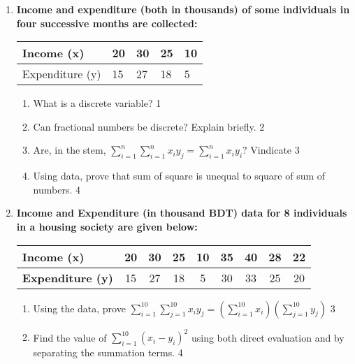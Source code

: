 \documentclass[a4paper,oneside]{book}
\begin{document}
\begin{enumerate}
  \item
  \textbf{Income and expenditure (both in thousands) of some individuals in four successive months are collected:}
 
\begin{table}[h]
 \begin{center}
\begin{tabular}{l|l|l|l|l}

Income (x)  & 20 & 30 & 25 & 10 \\ \hline
Expenditure (y) & 15  & 27  & 18 & 5 \\ 
\end{tabular}
\end{center}
\end{table}


  \begin{enumerate}
    \item
	What is a discrete variable? \hfill 1
    \item
    	Can fractional numbers be discrete? Explain briefly.  \hfill 2
    \item
    	Are, in the stem, $\displaystyle \sum_{i=1}^{n} 
    	\sum_{i=1}^{n} x_iy_j = \sum_{i=1}^{n} x_iy_i?$ Vindicate \hfill 3
     \item
     	Using data, prove  that sum of square is unequal 
     	to square of sum of numbers. \hfill 4
  \end{enumerate}
  
  
  \item
\textbf{Income and Expenditure (in thousand BDT) data for 8 individuals in a housing society are given below:}

\begin{table}[h]
\centering
\begin{tabular}{l|cccccccc}
\textbf{Income (x)}       & 20 & 30 & 25 & 10 & 35 & 40 & 28 & 22 \\ \hline
\textbf{Expenditure (y)}  & 15 & 27 & 18 &  5 & 30 & 33 & 25 & 20
\end{tabular}
\end{table}


  \begin{enumerate}
    \item Using the data, prove $\displaystyle \sum_{i=1}^{10} \sum_{j=1}^{10}x_i y_j = (\sum_{i=1}^{10}x_i) (\sum_{j=1}^{10} y_j)$ \hfill 3
     \item Find the value of $\sum_{i=1}^{10} (x_i- y_i)^2$ using both direct evaluation and by separating the summation terms. \hfill 4
  \end{enumerate}


\end{enumerate}
\end{document}
